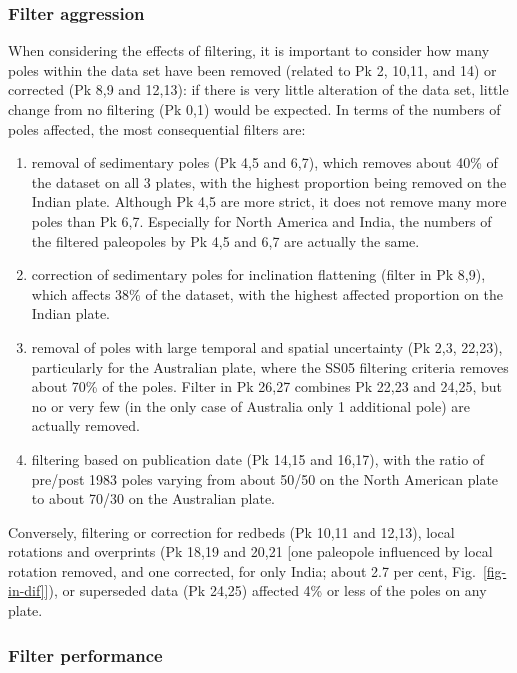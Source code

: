 \subsubsection{Filter aggression}

When considering the effects of filtering, it is important to consider how many
poles within the data set have been removed (related to Pk 2, 10,11,
and 14) or corrected (Pk 8,9 and 12,13): if there is very little
alteration of the data set, little change from no filtering (Pk 0,1) would be
expected. In terms of the numbers of poles affected, the most consequential
filters are:
%
\begin{enumerate}
  \item removal of sedimentary poles (Pk 4,5 and 6,7), which removes about
        40\% of the dataset on all 3 plates, with the highest
		proportion being removed on the Indian plate. Although Pk 4,5 are
		more strict, it does not remove many more poles than Pk 6,7.
		Especially for North America and India, the numbers of the filtered
		paleopoles by Pk 4,5 and 6,7 are actually the same.
  \item correction of sedimentary poles for inclination flattening (filter
		in Pk 8,9), which affects 38\% of the dataset, with the
		highest affected proportion on the Indian plate.
  \item removal of poles with large temporal and spatial uncertainty (Pk
		2,3, 22,23), particularly for the Australian plate, where the SS05
		filtering criteria removes about 70\% of the poles. Filter in Pk 26,27
		combines Pk 22,23 and 24,25, but no or very few (in the only case
		of Australia only 1 additional pole) are actually removed.
  \item filtering based on publication date (Pk 14,15 and 16,17), with the
		ratio of pre/post 1983 poles varying from about 50/50 on the North
		American plate to about 70/30 on the Australian plate.
\end{enumerate}

Conversely, filtering or correction for redbeds (Pk 10,11 and 12,13), local
rotations and overprints (Pk 18,19 and 20,21 [one paleopole influenced by
local rotation removed, and one corrected, for only India; about 2.7 per cent,
Fig.~\ref{fig-in-dif}]), or superseded data (Pk 24,25) affected 4\% or less
of the poles on any plate.

\subsubsection{Filter performance}


